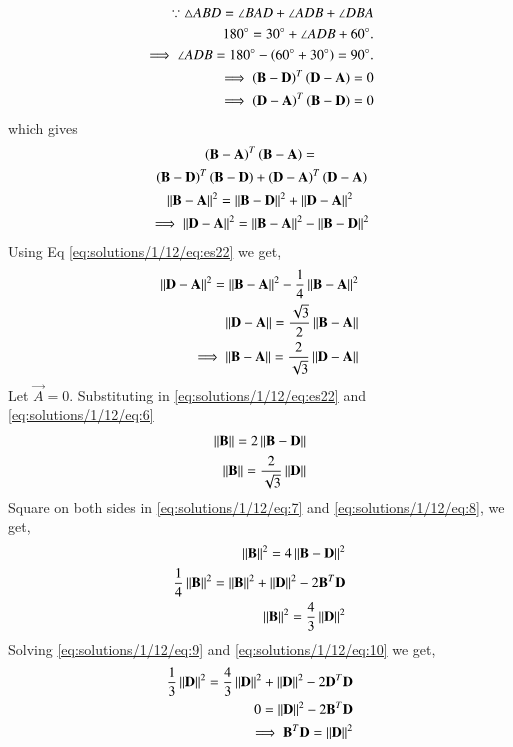 \begin{align}
\because \triangle ABD = \angle BAD + \angle ADB + \angle DBA\\
180\degree = 30\degree + \angle ADB + 60\degree.\\
\implies \angle ADB = 180\degree -\left(60\degree + 30\degree\right) = 90\degree.\\
  \implies\left(\mathbf{B-D}\right)^{T}\left(\mathbf{D-A}\right)=0\\ \implies\left(\mathbf{D-A}\right)^{T}\left(\mathbf{B-D}\right) =0
\end{align}
which gives
\begin{multline}
    \brak{\vec{B-A}}^{T}\brak{\vec{B-A}} =\\\ \brak{\vec{B-D}}^{T}\brak{\vec{B-D}} + \brak{\vec{D-A}}^{T}\brak{\vec{D-A}}\\
    \norm{\vec{B-A}}^2=\norm{\vec{B-D}}^2 + \norm{\vec{D-A}}^2\\
    \implies\norm{\vec{D-A}}^2=\norm{\vec{B-A}}^2-\norm{\vec{B-D}}^2\label{eq:solutions/1/12/eq:5}
\end{multline}
Using Eq \eqref{eq:solutions/1/12/eq:es22} we get,
\begin{align}
\left\lVert\mathbf{D-A}\right\rVert^2=\left\lVert\mathbf{B-A}\right\rVert^2-\frac{1}{4}\left\lVert\mathbf{B-A}\right\rVert^2\label{eq:solutions/1/12/eq:24}\\
 \left\lVert\mathbf{D-A}\right\rVert=\frac{\sqrt{3}}{2}\left\lVert\mathbf{B-A}\right\rVert\\
  \implies\left\lVert\mathbf{B-A}\right\rVert = \frac{2}{\sqrt{3}}\left\lVert\mathbf{D-A}\right\rVert\label{eq:solutions/1/12/eq:6}
\end{align}
Let $\vec{A}=0$. Substituting in \eqref{eq:solutions/1/12/eq:es22} and \eqref{eq:solutions/1/12/eq:6}
\begin{align}
    \label{eq:solutions/1/12/eq:7}\left\lVert\mathbf{B}\right\rVert=2\left\lVert\mathbf{B-D}\right\rVert\\
    \label{eq:solutions/1/12/eq:8}\left\lVert\mathbf{B}\right\rVert=\frac{2}{\sqrt{3}}\left\lVert\mathbf{D}\right\rVert
\end{align}
Square on both sides in \eqref{eq:solutions/1/12/eq:7} and \eqref{eq:solutions/1/12/eq:8}, we get,
\begin{align}
    \left\lVert\mathbf{B}\right\rVert^2=4\left\lVert\mathbf{B-D}\right\rVert^2\\
    \frac{1}{4}\left\lVert\mathbf{B}\right\rVert^2=\left\lVert\mathbf{B}\right\rVert^2+\left\lVert\mathbf{D}\right\rVert^2-2\mathbf{B}^T\mathbf{D}\label{eq:solutions/1/12/eq:9}\\
\left\lVert\mathbf{B}\right\rVert^2 = \frac{4}{3}\left\lVert\mathbf{D}\right\rVert^2\label{eq:solutions/1/12/eq:10}
\end{align}
Solving \eqref{eq:solutions/1/12/eq:9} and \eqref{eq:solutions/1/12/eq:10} we get,
\begin{align}
    \frac{1}{3}\left\lVert\mathbf{D}\right\rVert^2=\frac{4}{3}\left\lVert\mathbf{D}\right\rVert^2+\left\lVert\mathbf{D}\right\rVert^2-2\mathbf{D}^T\mathbf{D}\\
    0=\left\lVert\mathbf{D}\right\rVert^2-2\mathbf{B}^T\mathbf{D}\\
     \implies\mathbf{B}^T\mathbf{D}=\left\lVert\mathbf{D}\right\rVert^2\label{eq:solutions/1/12/eq:15}
\end{align}
